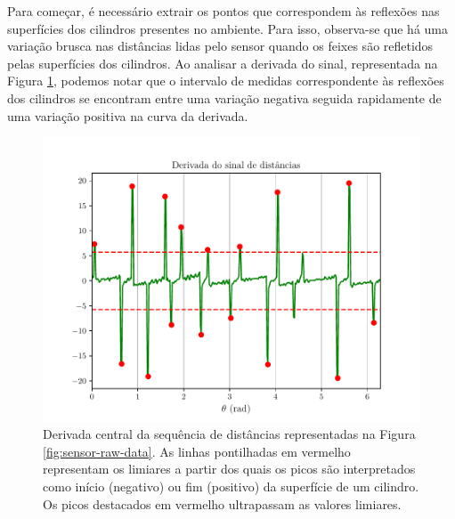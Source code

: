 Para começar, é necessário extrair os pontos que correspondem às reflexões nas 
superfícies dos cilindros presentes no ambiente. Para isso, observa-se que há uma variação brusca nas distâncias lidas pelo sensor quando os feixes são 
refletidos pelas superfícies dos cilindros. Ao analisar a derivada do sinal, 
representada na Figura \ref{fig:sensor-derivative}, podemos notar que o intervalo de medidas 
correspondente às reflexões dos cilindros se encontram entre uma variação 
negativa seguida rapidamente de uma variação positiva na curva da derivada.
\begin{figure}[]
  \centering
  \includegraphics[width=.6\textwidth]{figs/signal_derivative.pdf}
  \caption{Derivada central da sequência de distâncias representadas na Figura \ref{fig:sensor-raw-data}. As linhas pontilhadas em vermelho 
  representam os limiares a partir dos quais os picos são interpretados 
  como início (negativo) ou fim (positivo) da superfície de um cilindro. Os picos destacados 
  em vermelho ultrapassam as valores limiares.}
  \label{fig:sensor-derivative}
\end{figure}

